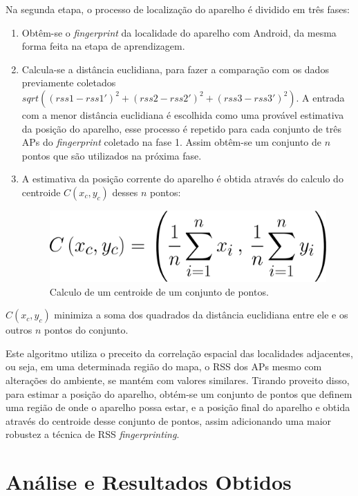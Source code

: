   Na segunda etapa, o processo de localização do aparelho é dividido em três fases:
  \begin{enumerate}
   \item Obtêm-se o \textit{fingerprint} da localidade
  do aparelho com Android, da mesma forma feita na etapa de aprendizagem.
  \item Calcula-se a distância euclidiana, para fazer a comparação com os 
  dados previamente coletados $sqrt((rss1-rss1')^{2}+(rss2-rss2')^{2}+(rss3-rss3')^{2})$.
  A entrada com a menor distância euclidiana é escolhida como uma provável estimativa da
  posição do aparelho, esse processo é repetido para cada conjunto de três APs do \textit{fingerprint} coletado na fase 1. 
 Assim obtêm-se um conjunto de $n$ pontos que são utilizados na próxima fase. 
 \item A estimativa da posição corrente do aparelho é obtida através do calculo do centroide $C(x_c,y_c)$ desses $n$ pontos:
  \begin{figure}[hbt]
  \centering
  \includegraphics[scale=0.23]{images/centroid.png}
  \caption{Calculo de um centroide de um conjunto de pontos.}
  \label{fig:centroidFormula}
  \end{figure}
  \end{enumerate}
   
  $C(x_c,y_c)$ minimiza a soma dos quadrados da distância euclidiana entre ele e os outros $n$ pontos do conjunto\cite{centroid}.
  
      Este algoritmo utiliza o preceito da correlação espacial das localidades adjacentes\cite{fingerPrint2}, 
  ou seja, em uma determinada região do mapa, o RSS dos APs
  mesmo com alterações do ambiente, se mantém com valores similares. Tirando proveito disso, para estimar a posição do aparelho, 
  obtém-se um conjunto de pontos que definem uma região de onde o aparelho possa estar, e a posição final do aparelho 
  e obtida através do centroide desse conjunto de pontos, assim adicionando uma maior robustez 
  a técnica de RSS \textit{fingerprinting}.
  
  \section{Análise e Resultados Obtidos}
 
